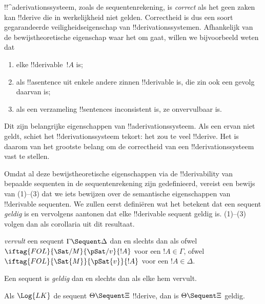 \documentclass[openany]{memoir}
\begin{document}
      {}
      {}


\begin{explain}
!!^a{derivation}ssysteem, zoals de sequentenrekening, is \emph{correct}
als het geen zaken kan !!{derive} die in werkelijkheid niet gelden.
Correctheid is dus een soort gegarandeerde veiligheidseigenschap van
!!{derivation}ssystemen. Afhankelijk van de bewijstheoretische
eigenschap waar het om gaat, willen we bijvoorbeeld weten dat
\begin{enumerate}
\item elke !!{derivable}~$!A$  is;
\item als !!a{sentence} uit enkele andere zinnen !!{derivable}
  is, die zin ook een gevolg daarvan is;
\item als een verzameling !!{sentence}s inconsistent is, ze
  onvervulbaar is.
\end{enumerate}
Dit zijn belangrijke eigenschappen van !!a{derivation}ssysteem. Als
een ervan niet geldt, schiet het !!{derivation}ssysteem tekort: het zou
te veel !!{derive}. Het is daarom van het grootste belang om de
correctheid van een !!{derivation}ssysteem vast te stellen.

Omdat al deze bewijstheoretische eigenschappen via de
!!{derivability} van bepaalde sequenten in de sequentenrekening zijn
gedefinieerd, vereist een bewijs van (1)--(3) dat we iets bewijzen over
de semantische eigenschappen van !!{derivable} sequenten. We zullen
eerst definiëren wat het betekent dat een sequent \emph{geldig} is en
vervolgens aantonen dat elke !!{derivable} sequent geldig is. (1)--(3)
volgen dan als corollaria uit dit resultaat.
\end{explain}

\begin{defn}
 \emph{vervult} een sequent
$\Gamma \Sequent \Delta$ dan en slechts dan als ofwel
$\iftag{FOL}{\Sat/{M}}{\pSat/{v}}{!A}$ voor een $!A \in \Gamma$, ofwel
$\iftag{FOL}{\Sat{M}}{\pSat{v}}{!A}$ voor een $!A \in \Delta$.

Een sequent is \emph{geldig} dan en slechts dan als elke
hem vervult.
\end{defn}

\begin{thm}[Correctheid]
 Als $\Log{LK}$ de sequent $\Theta
\Sequent \Xi$ !!{derive}, dan is $\Theta \Sequent \Xi$ geldig.
\end{thm}
\end{document}
